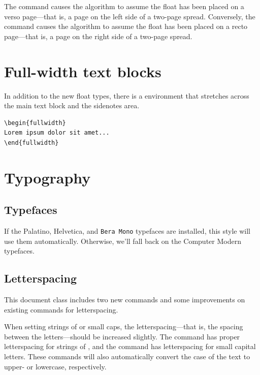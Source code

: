 The  command causes the algorithm to assume the
float has been placed on a verso page---that is, a page on the left side of a
two-page spread.  Conversely, the  command causes
the algorithm to assume the float has been placed on a recto page---that is, a
page on the right side of a two-page spread.


\section{Full-width text blocks}

In addition to the new float types, there is a 
environment that stretches across the main text block and the sidenotes
area.

\begin{Verbatim}
\begin{fullwidth}
Lorem ipsum dolor sit amet...
\end{fullwidth}
\end{Verbatim}

\begin{fullwidth}
\small\itshape\lipsum[1]
\end{fullwidth}

\section{Typography}\label{sec:typography}

\subsection{Typefaces}\label{sec:typefaces}
If the Palatino, \textsf{Helvetica}, and \texttt{Bera Mono} typefaces are installed, this style
will use them automatically.  Otherwise, we'll fall back on the Computer Modern
typefaces.

\subsection{Letterspacing}\label{sec:letterspacing}
This document class includes two new commands and some improvements on
existing commands for letterspacing.

When setting strings of  or small caps, the
letter\-spacing---that is, the spacing between the letters---should be
increased slightly.\cite[][p.32]{Bringhurst2005} The  command has proper letterspacing for
strings of , and the  command
has letterspacing for small capital letters.  These commands
will also automatically convert the case of the text to upper- or
lowercase, respectively.

